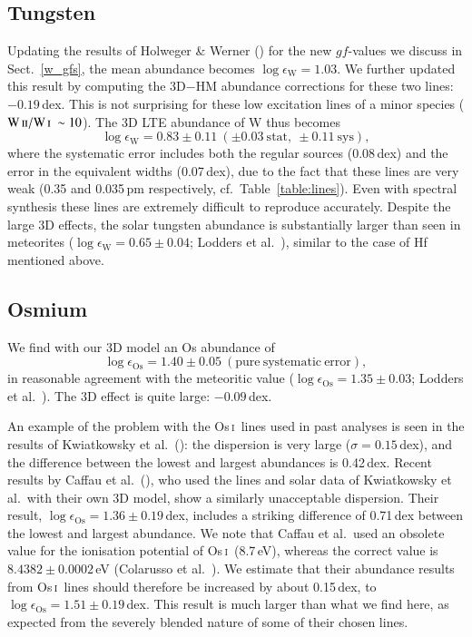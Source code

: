 \documentclass[traditabstract]{aa}
\newcommand{\altosi}{Os\,\textsc{i}}
\newcommand{\altwi}{W\,\textsc{i}}
\newcommand{\altwii}{W\,\textsc{ii}}
\newcommand{\osi}{\altosi\ }
\newcommand{\wi}{\altwi\ }
\begin{document}
\subsection{Tungsten}
Updating the results of Holweger \& Werner (\cite{hol2}) for the new $gf$-values we discuss in Sect.\ \ref{w_gfs}, the mean abundance becomes $\log\epsilon_{\mathrm{W}}=1.03$.  We further updated this result by computing the 3D$-$HM abundance corrections for these two lines: $-0.19$\,dex. This is not surprising for these low excitation lines of a minor species ($\mathrm{\altwii/\wi}\sim10$). The 3D LTE abundance of W thus becomes
\begin{displaymath}
\log\epsilon_{\mathrm{W}}=0.83\pm0.11\ (\pm0.03\ \mathrm{stat},\ \pm0.11\ \mathrm{sys}), 
\end{displaymath}
where the systematic error includes both the regular sources (0.08\,dex) and the error in the equivalent widths (0.07\,dex), due to the fact that these lines are very weak (0.35 and 0.035\,pm respectively, cf.\ Table~\ref{table:lines}). Even with spectral synthesis these lines are extremely difficult to reproduce accurately.  Despite the large 3D effects, the solar tungsten abundance is substantially larger than seen in meteorites ($\log \epsilon_{\mathrm{W}}=0.65\pm0.04$; Lodders et al.\ \cite{lodd}), similar to the case of Hf mentioned above.

\subsection{Osmium}
We find with our 3D model an Os abundance of
\begin{displaymath}
\log\epsilon_{\mathrm{Os}}=1.40\pm0.05\ \mathrm{(pure\ systematic\ error)},
\end{displaymath}
in reasonable agreement with the meteoritic value ($\log \epsilon_{\mathrm{Os}}=1.35\pm0.03$; Lodders et al.\ \cite{lodd}).  The 3D effect is quite large: $-0.09$\,dex.

An example of the problem with the \osi lines used in past analyses is seen in the results of Kwiatkowsky et al.\ (\cite{kwia2}): the dispersion is very large ($\sigma=0.15$\,dex), and the difference between the lowest and largest abundances is 0.42\,dex.  Recent results by Caffau et al.\ (\cite{caf3}), who used the lines and solar data of Kwiatkowsky et al.\ with their own 3D model, show a similarly unacceptable dispersion.  Their result, $\log\epsilon_{\mathrm{Os}}=1.36\pm0.19$\,dex, includes a striking difference of 0.71\,dex between the lowest and largest abundance.  We note that Caffau et al.\ used an obsolete value for the ionisation potential of \osi (8.7\,eV), whereas the correct value is $8.4382\pm0.0002$\,eV (Colarusso et al.\ \cite{cola}).  We estimate that their abundance results from \osi lines should therefore be increased by about 0.15\,dex, to $\log\epsilon_{\mathrm{Os}}=1.51\pm0.19$\,dex.  This result is much larger than what we find here, as expected from the severely blended nature of some of their chosen lines.
\end{document}

